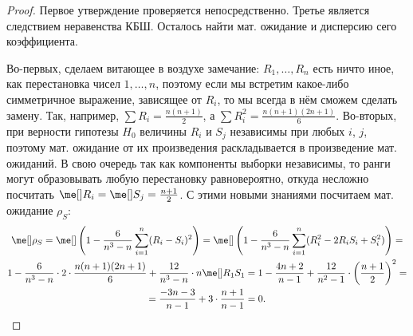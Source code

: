 \begin{proof}
Первое утверждение проверяется непосредственно. Третье является следствием неравенства КБШ. Осталось найти мат. ожидание и дисперсию сего коэффициента.

Во-первых, сделаем витающее в воздухе замечание: $R_1, \ldots, R_n$ есть ничто иное, как перестановка чисел $1, \ldots, n$, поэтому если мы встретим какое-либо симметричное выражение, зависящее от $R_i$, то мы всегда в нём сможем сделать замену. Так, например, $\sum R_i = \frac{n(n+1)}{2}$, а $\sum R^2_i = \frac{n(n+1)(2n+1)}{6}$. Во-вторых, при верности гипотезы $H_0$ величины $R_i$ и $S_j$ независимы при любых $i$, $j$, поэтому мат. ожидание от их произведения раскладывается в произведение мат. ожиданий. В свою очередь так как компоненты выборки независимы, то ранги могут образовывать любую перестановку равновероятно, откуда несложно посчитать $\me[]R_i = \me[]S_j = \frac{n+1}{2}$. С этими новыми знаниями посчитаем мат. ожидание $\rho_S$:
\begin{gather*}
    \me[] \rho_S = \me[] \left(1 - \frac{6}{n^3-n}  \sum_{i=1}^n (R_i - S_i)^2\right) = \me[] \left(1 - \frac{6}{n^3-n}  \sum_{i=1}^n (R_i^2 - 2 R_i S_i + S_i^2)\right) = \\
    1 - \frac{6}{n^3-n} \cdot 2 \cdot \frac{n(n+1)(2n+1)}{6} + \frac{12}{n^3-n} \cdot n\me[]R_1 S_1 = 1 - \frac{4n+2}{n-1} + \frac{12}{n^2-1} \cdot \left(\frac{n+1}{2}\right)^2 = \\
    = \frac{-3n-3}{n-1} + 3 \cdot\frac{n+1}{n-1} = 0.
\end{gather*}


\end{proof}
